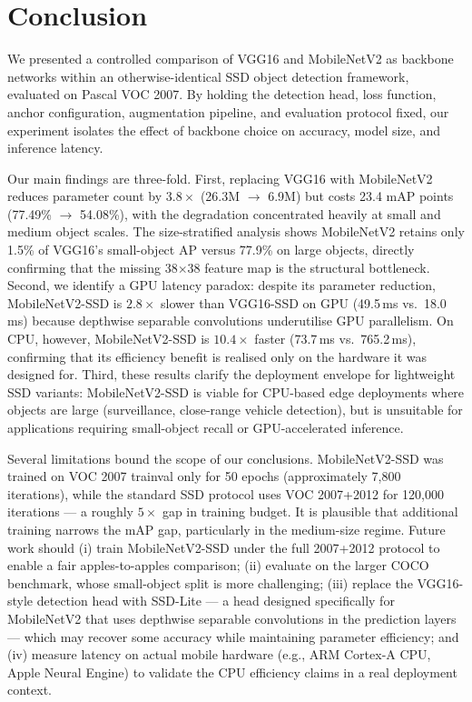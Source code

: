 \documentclass{article}
\begin{document}
\section{Conclusion}
\label{sec:conclusion}

We presented a controlled comparison of VGG16 and MobileNetV2 as backbone networks within an otherwise-identical SSD object detection framework, evaluated on Pascal VOC 2007. By holding the detection head, loss function, anchor configuration, augmentation pipeline, and evaluation protocol fixed, our experiment isolates the effect of backbone choice on accuracy, model size, and inference latency.

Our main findings are three-fold. First, replacing VGG16 with MobileNetV2 reduces parameter count by $3.8\times$ (26.3M $\to$ 6.9M) but costs 23.4 mAP points (77.49\% $\to$ 54.08\%), with the degradation concentrated heavily at small and medium object scales. The size-stratified analysis shows MobileNetV2 retains only 1.5\% of VGG16's small-object AP versus 77.9\% on large objects, directly confirming that the missing 38$\times$38 feature map is the structural bottleneck. Second, we identify a GPU latency paradox: despite its parameter reduction, MobileNetV2-SSD is $2.8\times$ slower than VGG16-SSD on GPU (49.5\,ms vs.\ 18.0\,ms) because depthwise separable convolutions underutilise GPU parallelism. On CPU, however, MobileNetV2-SSD is $10.4\times$ faster (73.7\,ms vs.\ 765.2\,ms), confirming that its efficiency benefit is realised only on the hardware it was designed for. Third, these results clarify the deployment envelope for lightweight SSD variants: MobileNetV2-SSD is viable for CPU-based edge deployments where objects are large (surveillance, close-range vehicle detection), but is unsuitable for applications requiring small-object recall or GPU-accelerated inference.

Several limitations bound the scope of our conclusions. MobileNetV2-SSD was trained on VOC 2007 trainval only for 50 epochs (approximately 7,800 iterations), while the standard SSD protocol uses VOC 2007+2012 for 120,000 iterations — a roughly $5\times$ gap in training budget. It is plausible that additional training narrows the mAP gap, particularly in the medium-size regime. Future work should (i) train MobileNetV2-SSD under the full 2007+2012 protocol to enable a fair apples-to-apples comparison; (ii) evaluate on the larger COCO benchmark, whose small-object split is more challenging; (iii) replace the VGG16-style detection head with SSD-Lite — a head designed specifically for MobileNetV2 that uses depthwise separable convolutions in the prediction layers — which may recover some accuracy while maintaining parameter efficiency; and (iv) measure latency on actual mobile hardware (e.g., ARM Cortex-A CPU, Apple Neural Engine) to validate the CPU efficiency claims in a real deployment context.
\end{document}
